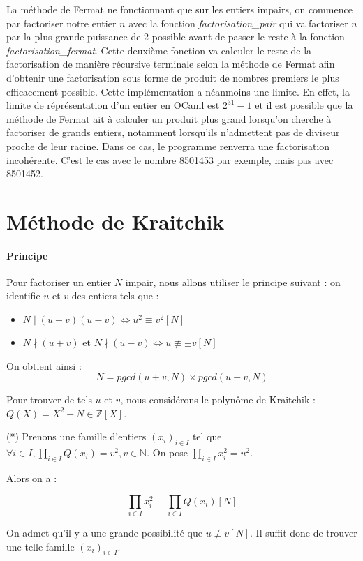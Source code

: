 \documentclass[11pt,a4paper]{article}
\begin{document}
	La méthode de Fermat ne fonctionnant que sur les entiers impairs, on commence par factoriser notre entier $n$ avec la fonction \textit{factorisation\_pair} qui va factoriser $n$ par la plus grande puissance de 2 possible avant de passer le reste à la fonction \textit{factorisation\_fermat}. Cette deuxième fonction va calculer le reste de la factorisation de manière récursive terminale selon la méthode de Fermat afin d'obtenir une factorisation sous forme de produit de nombres premiers le plus efficacement possible. Cette implémentation a néanmoins une limite. En effet, la limite de réprésentation d'un entier en OCaml est $2^{31} - 1$ et il est possible que la méthode de Fermat ait à calculer un produit plus grand lorsqu'on cherche à factoriser de grands entiers, notamment lorsqu'ils n'admettent pas de diviseur proche de leur racine. Dans ce cas, le programme renverra une factorisation incohérente. C'est le cas avec le nombre 8501453 par exemple, mais pas avec 8501452.

	
	\section{\LARGE{Méthode de Kraitchik}}
	
	\paragraph{Principe}
	Pour factoriser un entier $N$ impair, nous allons utiliser le principe suivant : on identifie $u$ et $v$ des entiers tels que :
	\begin{itemize}
		\item $N \mid(u+v)(u-v) \iff u^2 \equiv v^2 [N]$
		\item $N \nmid(u+v)$ et $ N \nmid(u-v) \iff u \not\equiv \pm v [N]$ 
	\end{itemize}
	
	On obtient ainsi :
	$$N = pgcd(u+v, N) \times pgcd(u-v, N)$$
	
	Pour trouver de tels $u$ et $v$, nous considérons le polynôme de Kraitchik : $Q(X) = X^2 - N  \in \mathbb{Z}[X]$.
	
	(*) Prenons une famille d'entiers $(x_i)_{i \in I}$ tel que $\forall i \in I, \prod_{i \in I} Q(x_i) = v^2, v \in \mathbb{N}$. On pose $\prod_{i \in I}x_i^2 = u^2$.
	
	 Alors on a : 
	
		$$\prod_{i \in I} x_i^2 \equiv \prod_{i \in I} Q(x_i) [N]$$
		
	On admet qu'il y a une grande possibilité que $u \not\equiv v [N]$.	
	Il suffit donc de trouver une telle famille $(x_i)_{i \in I}$.
	
\end{document}
